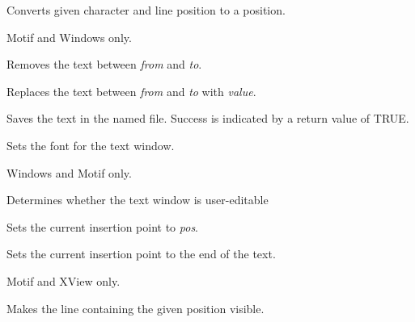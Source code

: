 

Converts given character and line position to a position.

Motif and Windows only.



Removes the text between {\it from} and {\it to}.



Replaces the text between {\it from} and {\it to} with {\it value}.



Saves the text in the named file. Success is indicated by a return
value of TRUE.



Sets the font for the text window.

Windows and Motif only.



Determines whether the text window is user-editable



Sets the current insertion point to {\it pos}.



Sets the current insertion point to the end of the text.

Motif and XView only.



Makes the line containing the given position visible.

